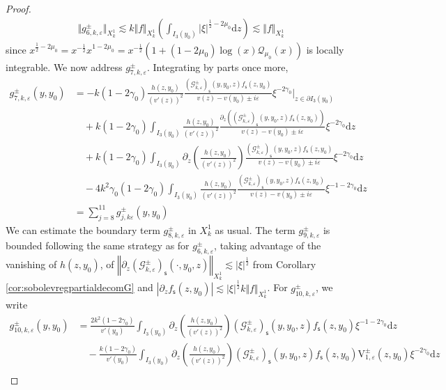\documentclass[11pt,reqno]{amsproc}
\theoremstyle{definition}
\numberwithin{equation}{section}
\newcommand{\G}{{\mathcal{G}}}
\newcommand{\s}{{\mathsf{s}}}
\renewcommand{\d}{\mathrm{d}}
\newcommand{\ep}{\varepsilon}
\begin{document}
\begin{proof}
\begin{align*}
\Vert g_{6,k,\ep}^\pm \Vert_{X_k^1}\lesssim k\Vert f\Vert_{X_k^1}\left(\int_{I_3(y_0)} |\xi|^{\frac12-2\mu_0} \d z \right) \lesssim \Vert f\Vert_{X_k^1}
\end{align*}
since $x^{\frac12-2\mu_0}=x^{-\frac12}x^{1-2\mu_0}= x^{-\frac12}\left( 1 +(1-2\mu_0) \log(x) \mathcal{Q}_{\mu_0}(x)\right)$ is locally integrable. We now address $g_{7,k,\ep}^\pm$. Integrating by parts once more, 
\begin{align*}
g_{7,k,\ep}^\pm(y,y_0) &= -k(1-2\gamma_0) \frac{h(z,y_0)}{(v'(z))^2} \frac{ \left( \G_{k,\ep}^\pm\right)_\s (y,y_0,z) f_\s(z,y_0) }{v(z) - v(y_0) \pm i\ep}\xi^{-2\gamma_0}\Big|_{z\in\partial I_3(y_0)} \\
&\quad + k(1-2\gamma_0) \int_{I_3(y_0)}\frac{h(z,y_0)}{(v'(z))^2} \frac{ \partial_z \left( \left( \G_{k,\ep}^\pm \right)_\s(y,y_0,z) f_\s(z,y_0) \right)}{v(z) - v(y_0) \pm i\ep}\xi^{-2\gamma_0} \d z \\
&\quad + k(1-2\gamma_0) \int_{I_3(y_0)} \partial_z \left( \frac{h(z,y_0)}{(v'(z))^2} \right) \frac{  \left( \G_{k,\ep}^\pm \right)_\s(y,y_0,z) f_\s(z,y_0) }{v(z) - v(y_0) \pm i\ep}\xi^{-2\gamma_0} \d z \\ 
&\quad -4k^2\gamma_0(1-2\gamma_0)\int_{I_3(y_0)} \frac{h(z,y_0)}{(v'(z))^2} \frac{  \left( \G_{k,\ep}^\pm \right)_\s(y,y_0,z) f_\s(z,y_0) }{v(z) - v(y_0) \pm i\ep}\xi^{-1-2\gamma_0} \d z \\ 
&= \sum_{j=8}^{11} g_{j,k\ep}^\pm(y,y_0)
\end{align*}
We can estimate the boundary term $g_{8,k,\ep}^\pm$ in $X_k^1$ as usual. The term $g_{9,k,\ep}^\pm$ is bounded following the same strategy as for $g_{6,k,\ep}^\pm$, taking advantage of the vanishing of $h(z,y_0)$, of $\left\Vert \partial_z \left(\G_{k,\ep}^\pm\right)_\s (\cdot,y_0,z) \right\Vert_{X_k^1} \lesssim |\xi|^\frac12$ from  Corollary \ref{cor:sobolevregpartialdecomG} and $\left| \partial_z f_\s(z,y_0) \right| \lesssim |\xi|^\frac12 k\Vert f \Vert_{X_k^1}$. For $g_{10,k,\ep}^\pm$, we write
\begin{align*}
g_{10,k,\ep}^\pm(y,y_0) &= \frac{2k^2(1-2\gamma_0)}{v'(y_0)} \int_{I_3(y_0)} \partial_z \left( \frac{h(z,y_0)}{(v'(z))^2} \right)  \left( \G_{k,\ep}^\pm \right)_\s(y,y_0,z) f_\s(z,y_0) \xi^{-1-2\gamma_0} \d z \\ 
&\quad - \frac{k(1-2\gamma_0)}{v'(y_0)}\int_{I_3(y_0)} \partial_z \left( \frac{h(z,y_0)}{(v'(z))^2} \right)  \left( \G_{k,\ep}^\pm \right)_\s(y,y_0,z) f_\s(z,y_0) \mathrm{V}_{1,\ep}^\pm(z,y_0)\xi^{-2\gamma_0} \d z \\ 

\end{align*}
\end{proof}
\end{document}
